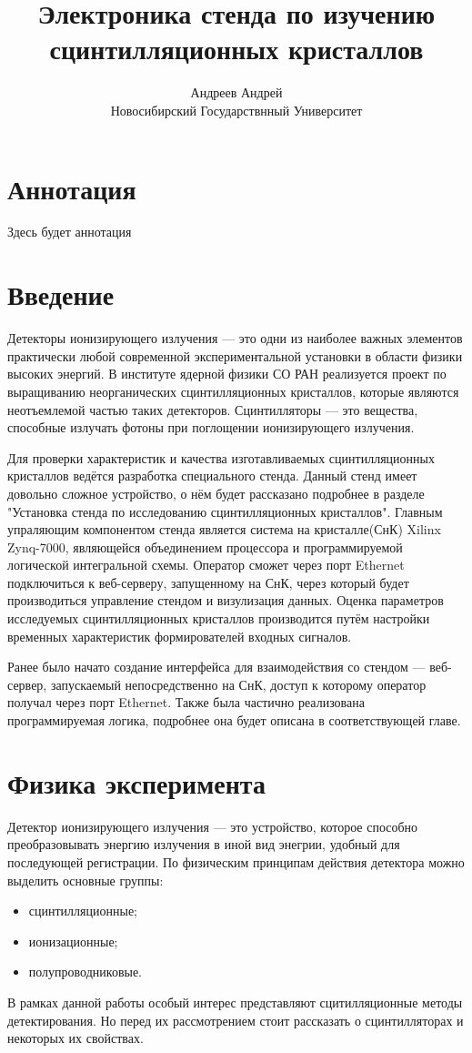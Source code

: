 \documentclass[a4paper, 12pt]{article}
\title{Электроника стенда по изучению сцинтилляционных кристаллов}
\author{Андреев Андрей\\Новосибирский Государствнный Университет}
\begin{document}
\maketitle
\newpage

\section*{Аннотация}
Здесь будет аннотация
\newpage

\tableofcontents
\newpage

\section{Введение}
Детекторы ионизирующего излучения --- это одни из наиболее важных элементов практически любой современной экспериментальной установки в области физики высоких энергий. В институте ядерной физики СО РАН реализуется проект по выращиванию неорганических сцинтилляционных кристаллов, которые являются неотъемлемой частью таких детекторов. Сцинтилляторы --- это вещества, способные излучать фотоны при поглощении ионизирующего излучения.\par
Для проверки характеристик и качества изготавливаемых сцинтилляционных кристаллов ведётся разработка специального стенда. Данный стенд имеет довольно сложное устройство, о нём будет рассказано подробнее в разделе "Установка стенда по исследованию сцинтилляционных кристаллов". Главным упраляющим компонентом стенда является система на кристалле(СнК) Xilinx Zynq-7000, являющейся объединением процессора и программируемой логической интегральной схемы. Оператор сможет через порт Ethernet подключиться к веб-серверу, запущенному на СнК, через который будет производиться управление стендом и визулизация данных. Оценка параметров исследуемых сцинтилляционных кристаллов производится путём настройки временных характеристик формирователей входных сигналов.\par
Ранее было начато создание интерфейса для взаимодействия со стендом --- веб-сервер, запускаемый непосредственно на СнК, доступ к которому оператор получал через порт Ethernet. Также была частично реализована программируемая логика, подробнее она будет описана в соответствующей главе.\par

\section{Физика эксперимента}
    Детектор ионизирующего излучения --- это устройство, которое способно преобразовывать энергию излучения в иной вид энегрии, удобный для последующей регистрации. По физическим принципам действия детектора можно выделить основные группы:
    \begin{itemize}
        \item сцинтилляционные;
        \item ионизационные;
        \item полупроводниковые.
    \end{itemize}\par
    В рамках данной работы особый интерес представляют сцитилляционные методы детектирования. Но перед их рассмотрением стоит рассказать о сцинтилляторах и некоторых их свойствах.
\end{document}
